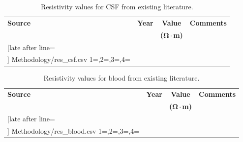 \begin{table}
	\centering
	\sffamily
	\small
	\caption[CSF resistivity values]{Resistivity values for CSF
	from existing literature.}
	\label{table:csf_res}
	
	\begin{tabularx}{0.9\textwidth}{p{2.6cm} c c X}
		\toprule
		\textbf{Source}	& \textbf{Year}	& \textbf{Value} & \textbf{Comments} \\
			& 	& \textbf{($ \mathsf{\boldsymbol{\Omega}} \cdot $m)} & \\
		\midrule
		
		\csvreader[late after line=\\]%
			{Methodology/res_csf.csv}%
			{1=\src,2=\year,3=\val,4=\comm}%
 			{\src & \year & \val & \comm}%
		\bottomrule
	\end{tabularx}
	
\end{table}

\begin{table}
	\centering
	\sffamily
	\small
	\caption[Blood resistivity values]{Resistivity values for blood from
	existing literature.}
	\label{table:blood_res}
	
	\begin{tabularx}{0.9\textwidth}{p{2.6cm} c c X}
		\toprule
		\textbf{Source}	& \textbf{Year}	& \textbf{Value} & \textbf{Comments} \\
			& 	& \textbf{($ \mathsf{\boldsymbol{\Omega}} \cdot $m)} & \\
		\midrule
		
		\csvreader[late after line=\\]%
			{Methodology/res_blood.csv}%
			{1=\src,2=\year,3=\val,4=\comm}%
 			{\src & \year & \val & \comm}%
		\bottomrule
	\end{tabularx}
	
\end{table}

